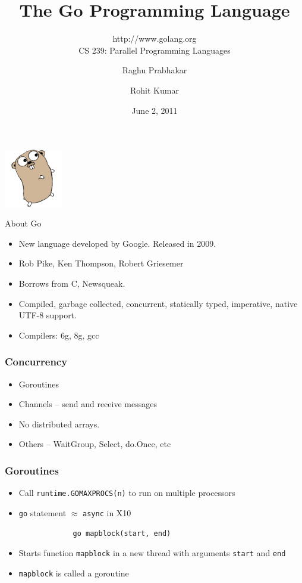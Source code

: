 \documentclass{beamer}
\title{The Go Programming Language}
\subtitle{http://www.golang.org \\ CS 239: Parallel Programming Languages}
\author{Raghu Prabhakar \and Rohit Kumar}
\date{June 2, 2011}
\begin{document}
\begin{frame}
\begin{center}
\includegraphics[width=1in]{gopher.png}
\end{center}
\titlepage
\end{frame}

\begin{frame} {About Go}
\begin{itemize}
  \item New language developed by Google. Released in 2009.
  \item Rob Pike, Ken Thompson, Robert Griesemer
  \item Borrows from C, Newsqueak.
  \item Compiled, garbage collected, concurrent, statically typed,
    imperative, native UTF-8 support.
  \item Compilers: 6g, 8g, gcc 
\end{itemize}
\end{frame}

\begin{frame}[fragile]
\frametitle{Concurrency}
  \begin{itemize}
    \item Goroutines
    \item Channels -- send and receive messages
    \item No distributed arrays. 
    \item Others -- WaitGroup, Select, do.Once, etc    
  \end{itemize}
\end{frame}

\begin{frame} [fragile]
\frametitle{Goroutines}
\begin{itemize}
  \item Call \verb=runtime.GOMAXPROCS(n)= to run on multiple processors
  \item \verb=go= statement $\approx$ \verb=async= in X10
\end{itemize}
\begin{center}
\begin{verbatim}
                go mapblock(start, end)
\end{verbatim}
\end{center}
\begin{itemize}
\item Starts function \verb=mapblock= in a new thread with arguments \verb=start= and \verb=end=
\item \verb=mapblock= is called a goroutine
\end{itemize}

\end{frame}
\end{document}

